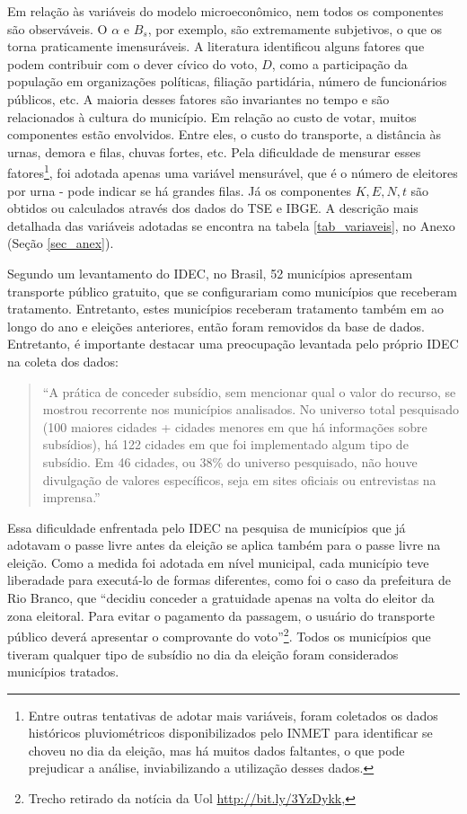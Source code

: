 Em relação às variáveis do modelo microeconômico, nem todos os componentes são observáveis. O $\alpha$ e $B_s$, por exemplo, são extremamente subjetivos, o que os torna praticamente imensuráveis. A literatura identificou alguns fatores que podem contribuir com o dever cívico do voto, $D$, como a participação da população em organizações políticas, filiação partidária, número de funcionários públicos, etc. A maioria desses fatores são invariantes no tempo e são relacionados à cultura do município. Em relação ao custo de votar, muitos componentes estão envolvidos. Entre eles, o custo do transporte, a distância às urnas, demora e filas, chuvas fortes, etc. Pela dificuldade de mensurar esses fatores\footnote{Entre outras tentativas de adotar mais variáveis, foram coletados os dados históricos pluviométricos disponibilizados pelo INMET para identificar se choveu no dia da eleição, mas há muitos dados faltantes, o que pode prejudicar a análise, inviabilizando a utilização desses dados.},
foi adotada apenas uma variável mensurável, que é o número de eleitores por urna - pode indicar se há grandes filas.  Já os componentes $K, E, N, t$ são obtidos ou calculados através dos dados do TSE e IBGE. A descrição mais detalhada das variáveis adotadas se encontra na tabela \ref{tab_variaveis}, no Anexo (Seção \ref{sec_anex}).


Segundo um levantamento do IDEC, no Brasil, 52 municípios apresentam transporte público gratuito, que se configurariam como municípios que receberam tratamento. Entretanto, estes municípios receberam tratamento também em ao longo do ano e eleições anteriores, então foram removidos da base de dados. Entretanto, é importante destacar uma preocupação levantada pelo próprio IDEC na coleta dos dados:

\begin{quote}
  ``A prática de conceder subsídio, sem mencionar qual o valor do recurso, se mostrou recorrente nos
  municípios analisados. No universo total pesquisado (100 maiores cidades + cidades menores em
  que há informações sobre subsídios), há 122 cidades em que foi implementado algum tipo de
  subsídio. Em 46 cidades, ou 38\% do universo pesquisado, não houve divulgação de valores
  específicos, seja em sites oficiais ou entrevistas na imprensa.''
\end{quote}

Essa dificuldade enfrentada pelo IDEC na pesquisa de municípios que já adotavam o passe livre antes da eleição se aplica também para o passe livre na eleição. Como a medida foi adotada em nível municipal, cada município teve liberadade para executá-lo de formas diferentes, como foi o caso da prefeitura de Rio Branco, que ``decidiu conceder a gratuidade apenas na volta do eleitor da zona eleitoral. Para evitar o pagamento da passagem, o usuário do transporte público deverá apresentar o comprovante do voto''\footnote{Trecho retirado da notícia da Uol \url{http://bit.ly/3YzDykk}, }.
Todos os municípios que tiveram qualquer tipo de subsídio no dia da eleição foram considerados municípios tratados.

